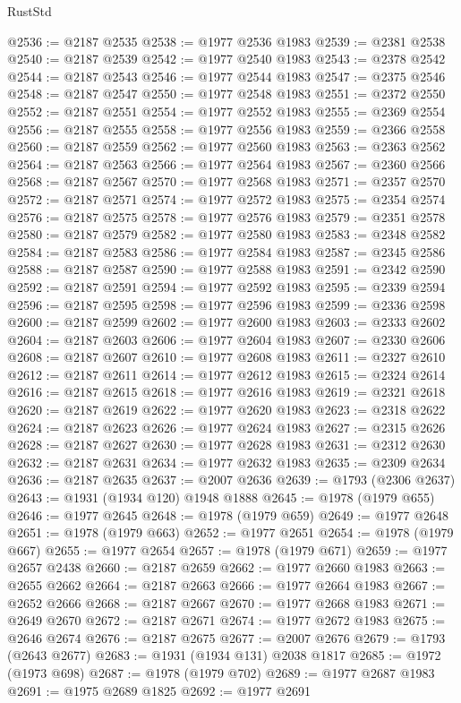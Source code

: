 \begin{lexlean}{RustStd}
\begin{coremodule}
@2536 := @2187 @2535
@2538 := @1977 @2536 @1983
@2539 := @2381 @2538
@2540 := @2187 @2539
@2542 := @1977 @2540 @1983
@2543 := @2378 @2542
@2544 := @2187 @2543
@2546 := @1977 @2544 @1983
@2547 := @2375 @2546
@2548 := @2187 @2547
@2550 := @1977 @2548 @1983
@2551 := @2372 @2550
@2552 := @2187 @2551
@2554 := @1977 @2552 @1983
@2555 := @2369 @2554
@2556 := @2187 @2555
@2558 := @1977 @2556 @1983
@2559 := @2366 @2558
@2560 := @2187 @2559
@2562 := @1977 @2560 @1983
@2563 := @2363 @2562
@2564 := @2187 @2563
@2566 := @1977 @2564 @1983
@2567 := @2360 @2566
@2568 := @2187 @2567
@2570 := @1977 @2568 @1983
@2571 := @2357 @2570
@2572 := @2187 @2571
@2574 := @1977 @2572 @1983
@2575 := @2354 @2574
@2576 := @2187 @2575
@2578 := @1977 @2576 @1983
@2579 := @2351 @2578
@2580 := @2187 @2579
@2582 := @1977 @2580 @1983
@2583 := @2348 @2582
@2584 := @2187 @2583
@2586 := @1977 @2584 @1983
@2587 := @2345 @2586
@2588 := @2187 @2587
@2590 := @1977 @2588 @1983
@2591 := @2342 @2590
@2592 := @2187 @2591
@2594 := @1977 @2592 @1983
@2595 := @2339 @2594
@2596 := @2187 @2595
@2598 := @1977 @2596 @1983
@2599 := @2336 @2598
@2600 := @2187 @2599
@2602 := @1977 @2600 @1983
@2603 := @2333 @2602
@2604 := @2187 @2603
@2606 := @1977 @2604 @1983
@2607 := @2330 @2606
@2608 := @2187 @2607
@2610 := @1977 @2608 @1983
@2611 := @2327 @2610
@2612 := @2187 @2611
@2614 := @1977 @2612 @1983
@2615 := @2324 @2614
@2616 := @2187 @2615
@2618 := @1977 @2616 @1983
@2619 := @2321 @2618
@2620 := @2187 @2619
@2622 := @1977 @2620 @1983
@2623 := @2318 @2622
@2624 := @2187 @2623
@2626 := @1977 @2624 @1983
@2627 := @2315 @2626
@2628 := @2187 @2627
@2630 := @1977 @2628 @1983
@2631 := @2312 @2630
@2632 := @2187 @2631
@2634 := @1977 @2632 @1983
@2635 := @2309 @2634
@2636 := @2187 @2635
@2637 := @2007 @2636
@2639 := @1793 (@2306 @2637)
@2643 := @1931 (@1934 @120) @1948 @1888
@2645 := @1978 (@1979 @655)
@2646 := @1977 @2645
@2648 := @1978 (@1979 @659)
@2649 := @1977 @2648
@2651 := @1978 (@1979 @663)
@2652 := @1977 @2651
@2654 := @1978 (@1979 @667)
@2655 := @1977 @2654
@2657 := @1978 (@1979 @671)
@2659 := @1977 @2657 @2438
@2660 := @2187 @2659
@2662 := @1977 @2660 @1983
@2663 := @2655 @2662
@2664 := @2187 @2663
@2666 := @1977 @2664 @1983
@2667 := @2652 @2666
@2668 := @2187 @2667
@2670 := @1977 @2668 @1983
@2671 := @2649 @2670
@2672 := @2187 @2671
@2674 := @1977 @2672 @1983
@2675 := @2646 @2674
@2676 := @2187 @2675
@2677 := @2007 @2676
@2679 := @1793 (@2643 @2677)
@2683 := @1931 (@1934 @131) @2038 @1817
@2685 := @1972 (@1973 @698)
@2687 := @1978 (@1979 @702)
@2689 := @1977 @2687 @1983
@2691 := @1975 @2689 @1825
@2692 := @1977 @2691

\end{coremodule}
\end{lexlean}
